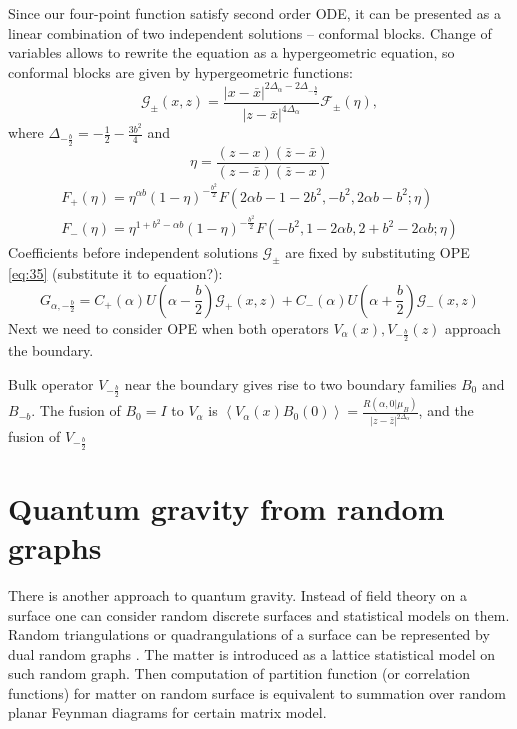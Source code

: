 \documentclass[12pt]{article}
\begin{document}
Since our four-point function satisfy second order ODE, it can be presented as a linear combination
of two independent solutions -- conformal blocks. Change of variables allows to rewrite the equation
as a hypergeometric equation, so conformal blocks are given by hypergeometric functions:
\begin{equation}
  \label{eq:71}
  \mathcal{G}_{\pm}(x,z)=\frac{|x-\bar x|^{2\Delta_{\alpha}-2\Delta_{-\frac{b}{2}}}}{|z-\bar
    x|^{4\Delta_{\alpha}}} \mathcal{F}_{\pm}(\eta),
\end{equation}
where $\Delta_{-\frac{b}{2}}=-\frac{1}{2}-\frac{3b^{2}}{4}$ and 
\begin{equation}
  \label{eq:72}
  \eta=\frac{(z-x)(\bar z-\bar x)}{(z-\bar x)(\bar z - x)}
\end{equation}
\begin{eqnarray}
  \label{eq:73}
  F_{+}(\eta)=\eta^{\alpha b}(1-\eta)^{-\frac{b^{2}}{2}} F(2\alpha b -1-2b^{2},-b^{2},2\alpha
  b-b^{2};\eta)\\
  F_{-}(\eta)=\eta^{1+b^{2}-\alpha b}(1-\eta)^{-\frac{b^{2}}{2}} F(-b^{2},1-2\alpha b,2+b^{2}-2\alpha
  b;\eta)
\end{eqnarray}
Coefficients before independent solutions $\mathcal{G}_{\pm}$ are fixed by substituting OPE
\eqref{eq:35} (substitute it to equation?):
\begin{equation}
  \label{eq:74}
  G_{\alpha,-\frac{b}{2}}=C_{+}(\alpha) U\left(\alpha-\frac{b}{2}\right) \mathcal{G}_{+}(x,z)+
  C_{-}(\alpha) U\left(\alpha+\frac{b}{2}\right) \mathcal{G}_{-}(x,z)
\end{equation}
Next we need to consider OPE when both operators $V_{\alpha}(x), V_{-\frac{b}{2}}(z)$ approach the
boundary. 

Bulk operator $V_{-\frac{b}{2}}$ near the boundary gives rise to two boundary families $B_{0}$ and
$B_{-b}$. The fusion of $B_{0}=I$ to $V_{\alpha}$ is $\left<V_{\alpha}(x)
  B_{0}(0)\right>=\frac{R(\alpha,0|\mu_{B})}{|z-\bar z|^{2\Delta_{\alpha}}}$, and the fusion of
$V_{-\frac{b}{2}}$ 

\section{Quantum gravity from random graphs}
\label{sec:quantum-gravity-from}

There is another approach to quantum gravity. Instead of field theory on a surface one can consider
random discrete surfaces and statistical models on them. Random triangulations or quadrangulations
of a surface can be represented by dual random graphs \cite{kazakov1986ising}.  The matter is
introduced as a lattice statistical model on such random graph. Then computation of partition
function (or correlation functions) for matter on random surface is equivalent to summation over
random planar Feynman diagrams for certain matrix model. 
\end{document}
